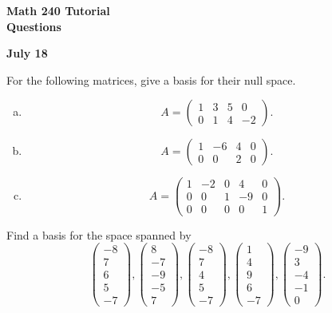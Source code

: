 \documentclass[a4paper,11pt]{article}
\begin{document}
\begin{center}
  {\Large\bfseries Math 240 Tutorial \\ Questions}
\end{center}
\begin{center}
  {\bfseries July 18}
\end{center}

 For the following matrices, give a basis for their
null space.
\begin{enumerate}[(a)]
\item
  \[
    A =
    \left(
      \begin{array}{rrrr}
        1 & 3 & 5 & 0 \\ 0 & 1 & 4 & -2
      \end{array}
    \right).
  \]
\item
  \[
    A =
    \left(
      \begin{array}{rrrr}
        1 & -6 & 4 & 0 \\ 0 & 0 & 2 & 0
      \end{array}
    \right).
  \]
\item
  \[
    A =
    \left(
      \begin{array}{rrrrr}
        1 & -2 & 0 & 4 & 0 \\
        0 & 0 & 1 & -9 & 0 \\
        0 & 0 & 0 & 0 & 1
      \end{array}
    \right).
  \]
\end{enumerate}

 Find a basis for the space spanned by
\[
  \left(
    \begin{array}{r}
      -8\\7\\6\\5\\-7
    \end{array}
  \right),
  \left(
    \begin{array}{r}
      8\\-7\\-9\\-5\\7
    \end{array}
  \right),
  \left(
    \begin{array}{r}
      -8\\7\\4\\5\\-7
    \end{array}
  \right),
  \left(
    \begin{array}{r}
      1\\4\\9\\6\\-7
    \end{array}
  \right),
  \left(
    \begin{array}{r}
      -9\\3\\-4\\-1\\0
    \end{array}
  \right).
\] \\
\end{document}
